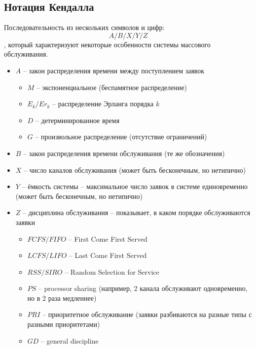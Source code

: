 \documentclass{article}
\begin{document}
\subsection*{Нотация Кендалла}
Последовательность из нескольких символов и цифр:
\[ A/B/X/Y/Z \]
, который характеризуют некоторые особенности системы массового обслуживания.
\begin{itemize}
\item $ A $ -- закон распределения времени между поступлением заявок
\begin{itemize}
\item $ M $ -- экспоненциальное (беспамятное распределение)
\item $ E_k / Er_k $ -- распределение Эрланга порядка $ k $
\item $ D $ -- детерминированное время
\item $ G $ -- произвольное распределение (отсутствие ограничений)
\end{itemize}
\item $ B $ -- закон распределения времени обслуживания (те же обозначения)
\item $ X $ -- число каналов обслуживания (может быть бесконечным, но нетипично)
\item $ Y $ -- ёмкость системы -- максимальное число заявок в системе единовременно (может быть бесконечным, но нетипично)
\item $ Z $ -- дисциплина обслуживания -- показывает, в каком порядке обслуживаются заявки
\begin{itemize}
\item $ FCFS / FIFO $ -- First Come First Served
\item $ LCFS / LIFO $ -- Last Come First Served
\item $ RSS / SIRO $ -- Random Selection for Service
\item $ PS $ -- processor sharing (например, 2 канала обслуживают одновременно, но в 2 раза медленнее)
\item $ PRI $ -- приоритетное обслуживание (заявки разбиваются на разные типы с разными приоритетами)
\item $ GD $ -- general discipline
\end{itemize}
\end{itemize}
\end{document}

